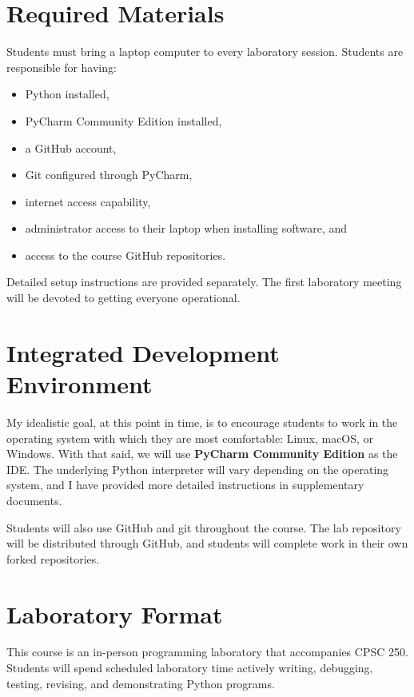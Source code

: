 \documentclass[11pt]{article}
\begin{document}
\section{Required Materials}

Students must bring a laptop computer to every laboratory session. Students are responsible for having:

\begin{itemize}[itemsep=0.2em]
    \item Python installed,
    \item PyCharm Community Edition installed,
    \item a GitHub account,
    \item Git configured through PyCharm,
    \item internet access capability,
    \item administrator access to their laptop when installing software, and
    \item access to the course GitHub repositories.
\end{itemize}

Detailed setup instructions are provided separately. The first laboratory meeting will be devoted to getting everyone operational.

\section{Integrated Development Environment}

My idealistic goal, at this point in time, is to encourage students to work in the operating system with which they are most comfortable: Linux, macOS, or Windows. With that said, we will use \textbf{PyCharm Community Edition} as the IDE. The underlying Python interpreter will vary depending on the operating system, and I have provided more detailed instructions in supplementary documents.

Students will also use GitHub and git throughout the course. The lab repository will be distributed through GitHub, and students will complete work in their own forked repositories.

\section{Laboratory Format}

This course is an in-person programming laboratory that accompanies CPSC 250. Students will spend scheduled laboratory time actively writing, debugging, testing, revising, and demonstrating Python programs.
\end{document}
